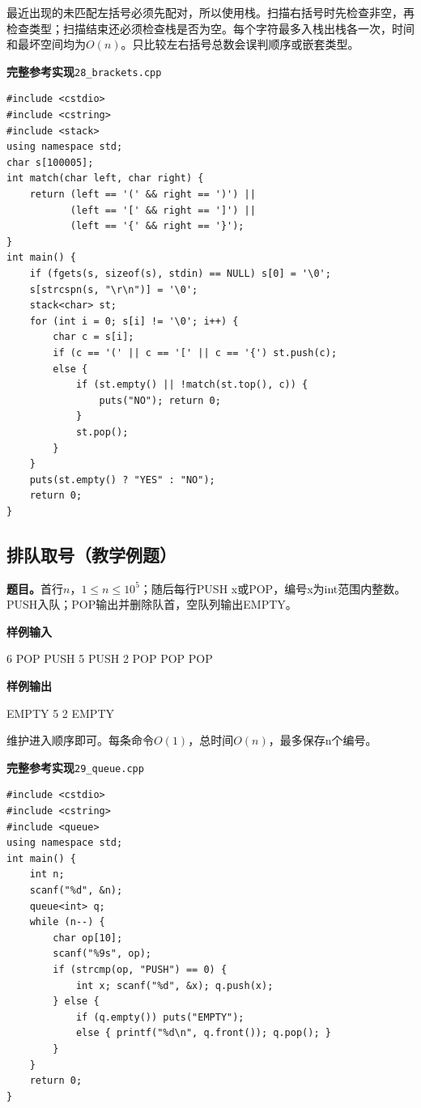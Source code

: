 \documentclass[UTF8,11pt,a4paper,fontset=none]{ctexart}
\begin{document}
最近出现的未匹配左括号必须先配对，所以使用栈。扫描右括号时先检查非空，再检查类型；扫描结束还必须检查栈是否为空。每个字符最多入栈出栈各一次，时间和最坏空间均为$O(n)$。只比较左右括号总数会误判顺序或嵌套类型。
\par\noindent\begin{minipage}{\linewidth}
\textbf{完整参考实现}\quad\texttt{28\_brackets.cpp}
\begin{lstlisting}
#include <cstdio>
#include <cstring>
#include <stack>
using namespace std;
char s[100005];
int match(char left, char right) {
    return (left == '(' && right == ')') ||
           (left == '[' && right == ']') ||
           (left == '{' && right == '}');
}
int main() {
    if (fgets(s, sizeof(s), stdin) == NULL) s[0] = '\0';
    s[strcspn(s, "\r\n")] = '\0';
    stack<char> st;
    for (int i = 0; s[i] != '\0'; i++) {
        char c = s[i];
        if (c == '(' || c == '[' || c == '{') st.push(c);
        else {
            if (st.empty() || !match(st.top(), c)) {
                puts("NO"); return 0;
            }
            st.pop();
        }
    }
    puts(st.empty() ? "YES" : "NO");
    return 0;
}
\end{lstlisting}
\end{minipage}\par

\subsection{排队取号（教学例题）}

\noindent\textbf{题目。}首行$n$，$1\le n\le10^5$；随后每行PUSH x或POP，编号x为int范围内整数。PUSH入队；POP输出并删除队首，空队列输出EMPTY。
\begin{tcolorbox}[samplebox,title={输入输出样例}]
\textbf{样例输入}
\begin{Sample}
6
POP
PUSH 5
PUSH 2
POP
POP
POP
\end{Sample}
\tcblower
\textbf{样例输出}
\begin{Sample}
EMPTY
5
2
EMPTY
\end{Sample}
\end{tcolorbox}
维护进入顺序即可。每条命令$O(1)$，总时间$O(n)$，最多保存n个编号。
\par\noindent\begin{minipage}{\linewidth}
\textbf{完整参考实现}\quad\texttt{29\_queue.cpp}
\begin{lstlisting}
#include <cstdio>
#include <cstring>
#include <queue>
using namespace std;
int main() {
    int n;
    scanf("%d", &n);
    queue<int> q;
    while (n--) {
        char op[10];
        scanf("%9s", op);
        if (strcmp(op, "PUSH") == 0) {
            int x; scanf("%d", &x); q.push(x);
        } else {
            if (q.empty()) puts("EMPTY");
            else { printf("%d\n", q.front()); q.pop(); }
        }
    }
    return 0;
}
\end{lstlisting}
\end{minipage}\par
\end{document}
